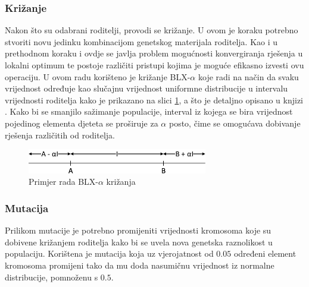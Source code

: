 \documentclass[times, utf8, zavrsni, numeric]{fer}
\begin{document}
\subsubsection{Križanje}
Nakon što su odabrani roditelji, provodi se križanje. 
U ovom je koraku potrebno stvoriti novu jedinku kombinacijom genetskog materijala roditelja. 
Kao i u prethodnom koraku i ovdje se javlja problem mogućnosti konvergiranja rješenja u lokalni optimum te postoje različiti pristupi kojima je moguće efikasno izvesti ovu operaciju.
U ovom radu korišteno je križanje BLX-$\alpha$ koje radi na način da svaku vrijednost određuje kao slučajnu vrijednost uniformne distribucije u intervalu vrijednosti roditelja kako je prikazano na slici \ref{fig:blx}, a što je detaljno opisano u knjizi \cite{GeneticAlgorithms}. 
Kako bi se smanjilo sažimanje populacije, interval iz kojega se bira vrijednost pojedinog elementa djeteta se proširuje za $\alpha$ posto, čime se omogućava dobivanje rješenja različitih od roditelja.

\begin{figure}[ht!]
    \centering
    \includegraphics[width=0.7\textwidth]{Images/Blx-a.pdf}
    \captionsetup{justification=centering}
    \caption{Primjer rada BLX-$\alpha$ križanja}
    \label{fig:blx}
\end{figure}

\subsubsection{Mutacija}
Prilikom mutacije je potrebno promijeniti vrijednosti kromosoma koje su dobivene križanjem roditelja kako bi se uvela nova genetska raznolikost u populaciju.
Korištena je mutacija koja uz vjerojatnost od $0.05$ određeni element kromosoma promijeni tako da mu doda nasumičnu vrijednost iz normalne distribucije, pomnoženu s $0.5$. 
\end{document}

